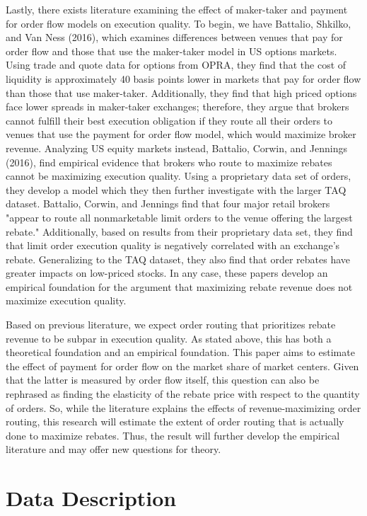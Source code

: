 \documentclass[12pt,a4paper]{article}
\begin{document}
		Lastly, there exists literature examining the effect of maker-taker and payment for order flow models on execution quality. To begin, we have Battalio, Shkilko, and Van Ness (2016), which examines differences between venues that pay for order flow and those that use the maker-taker model in US options markets. Using trade and quote data for options from OPRA, they find that the cost of liquidity is approximately 40 basis points lower in markets that pay for order flow than those that use maker-taker. Additionally, they find that high priced options face lower spreads in maker-taker exchanges; therefore, they argue that brokers cannot fulfill their best execution obligation if they route all their orders to venues that use the payment for order flow model, which would maximize broker revenue. Analyzing US equity markets instead, Battalio, Corwin, and Jennings (2016), find empirical evidence that brokers who route to maximize rebates cannot be maximizing execution quality. Using a proprietary data set of orders, they develop a model which they then further investigate with the larger TAQ dataset. Battalio, Corwin, and Jennings find that four major retail brokers "appear to route all nonmarketable limit orders to the venue offering the largest rebate." Additionally, based on results from their proprietary data set, they find that limit order execution quality is negatively correlated with an exchange's rebate. Generalizing to the TAQ dataset, they also find that order rebates have greater impacts on low-priced stocks. In any case, these papers develop an empirical foundation for the argument that maximizing rebate revenue does not maximize execution quality. 
		
		Based on previous literature, we expect order routing that prioritizes rebate revenue to be subpar in execution quality. As stated above, this has both a theoretical foundation and an empirical foundation. This paper aims to estimate the effect of payment for order flow on the market share of market centers. Given that the latter is measured by order flow itself, this question can also be rephrased as finding the elasticity of the rebate price with respect to the quantity of orders. So, while the literature explains the effects of revenue-maximizing order routing, this research will estimate the extent of order routing that is actually done to maximize rebates. Thus, the result will further develop the empirical literature and may offer new questions for theory. 
	
\pagebreak	
\section{Data Description}
\end{document}
